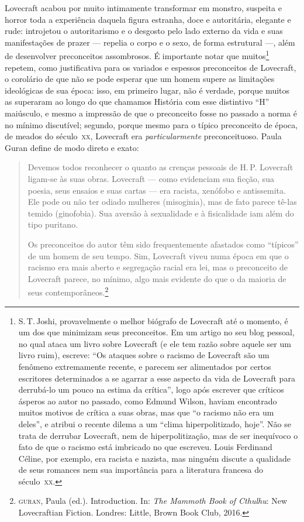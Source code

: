 Lovecraft acabou por muito intimamente transformar em monstro, suspeita
e horror toda a experiência daquela figura estranha, doce e autoritária,
elegante e rude: introjetou o autoritarismo e o desgosto pelo lado
externo da vida e suas manifestações de prazer --- repelia o
corpo e o sexo, de forma estrutural ---, além de
desenvolver preconceitos assombrosos. É importante notar que
muitos\footnote{S.\,T.\,Joshi, provavelmente o melhor biógrafo de
  Lovecraft até o momento, é um dos que minimizam seus preconceitos. Em
  um artigo no seu blog pessoal, no qual ataca um livro sobre Lovecraft
  (e ele tem razão sobre aquele ser um livro ruim), escreve: ``Os ataques
  sobre o racismo de Lovecraft são um fenômeno extremamente recente, e
  parecem ser alimentados por certos escritores determinados a se
  agarrar a esse aspecto da vida de Lovecraft para derrubá-lo um pouco
  na estima da crítica'', logo após escrever que críticos ásperos ao
  autor no passado, como Edmund Wilson, haviam encontrado muitos motivos
  de crítica a suas obras, mas que ``o racismo não era um deles'', e
  atribui o recente dilema a um ``clima hiperpolitizado, hoje''. Não se
  trata de derrubar Lovecraft, nem de hiperpolitização, mas de ser
  inequívoco o fato de que o racismo está imbricado no que escreveu.
  Louis Ferdinand Céline, por exemplo, era racista e nazista, mas
  ninguém discute a qualidade de seus romances nem sua importância para
  a literatura francesa do século~\textsc{xx}.} repetem, como justificativa para
os variados e espessos preconceitos de Lovecraft, o corolário de que não
se pode esperar que um homem supere as limitações ideológicas de sua
época: isso, em primeiro lugar, não é verdade, porque muitos as
superaram ao longo do que chamamos História com esse distintivo ``H''
maiúsculo, e mesmo a impressão de que o preconceito fosse no passado a
norma é no mínimo discutível; segundo, porque mesmo para o típico
preconceito de época, de meados do século~\textsc{xx}, Lovecraft era
\emph{particularmente} preconceituoso. Paula Guran define de modo direto
e exato:

\begin{quote}
Devemos todos reconhecer o quanto as crenças pessoais de H.\,P. Lovecraft
ligam-se às suas obras. Lovecraft --- como evidenciam sua ficção,
sua poesia, seus ensaios e suas cartas --- era racista, xenófobo e
antissemita. Ele pode ou não ter odiado mulheres (misoginia), mas de
fato parece tê-las temido (ginofobia). Sua aversão à sexualidade e à
fisicalidade iam além do tipo puritano.

Os preconceitos do autor têm sido frequentemente afastados como
``típicos'' de um homem de seu tempo. Sim, Lovecraft viveu numa época em
que o racismo era mais aberto e segregação racial era lei, mas o
preconceito de Lovecraft parece, no mínimo, algo mais evidente do que o
da maioria de seus contemporâneos.\footnote{\textsc{guran}, Paula (ed.). Introduction. In:
  \emph{The Mammoth Book of Cthulhu}: New Lovecraftian Fiction. Londres:
  Little, Brown Book Club, 2016.}
\end{quote}

